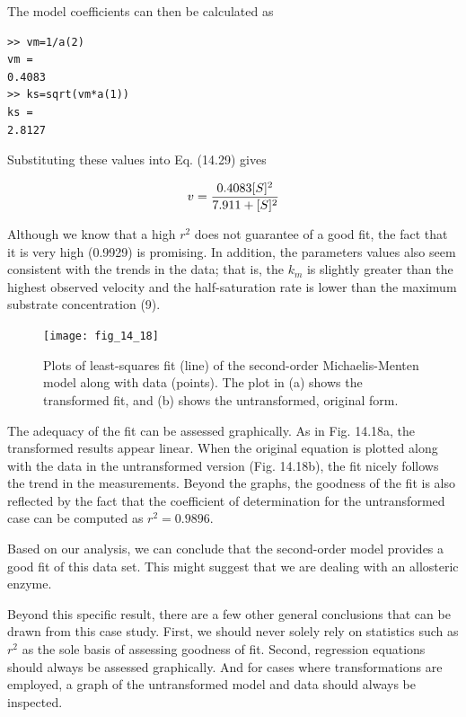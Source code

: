 \documentclass[../main.tex]{subfiles}
\begin{document}
\noindent The model coefficients can then be calculated as

\begin{lstlisting}[numbers=none] 
>> vm=1/a(2)
vm =
0.4083
>> ks=sqrt(vm*a(1))
ks =
2.8127
\end{lstlisting}

\noindent Substituting these values into Eq. (14.29) gives

\begin{equation}
	\notag
	v = \frac{0.4083[S]^2}{7.911 + [S]^2}
\end{equation}

Although we know that a high $r^2$ does not guarantee of a good fit, the fact that it is very high (0.9929) is promising. In addition, the parameters values also seem consistent with the trends in the data; that is, the $k_m$ is slightly greater than the highest observed velocity and the half-saturation rate is lower than the maximum substrate concentration (9).

\begin{figure}[H] 
	\centering
	\texttt{[image: fig\_14\_18]}
	\caption{\textsf{Plots of least-squares fit (line) of the second-order Michaelis-Menten model along with data (points). The plot in (a) shows the transformed fit, and (b) shows the untransformed, original form.}}
	\label{fig:fig_14_18}
\end{figure}

The adequacy of the fit can be assessed graphically. As in Fig. 14.18a, the transformed results appear linear. When the original equation is plotted along with the data in the untransformed version (Fig. 14.18b), the fit nicely follows the trend in the measurements. Beyond the graphs, the goodness of the fit is also reflected by the fact that the coefficient of determination for the untransformed case can be computed as $r^2 = 0.9896$.

Based on our analysis, we can conclude that the second-order model provides a good fit of this data set. This might suggest that we are dealing with an allosteric enzyme. 

Beyond this specific result, there are a few other general conclusions that can be drawn from this case study. First, we should never solely rely on statistics such as $r^2$ as the sole basis of assessing goodness of fit. Second, regression equations should always be assessed graphically. And for cases where transformations are employed, a graph of the untransformed model and data should always be inspected. 
\end{document}
